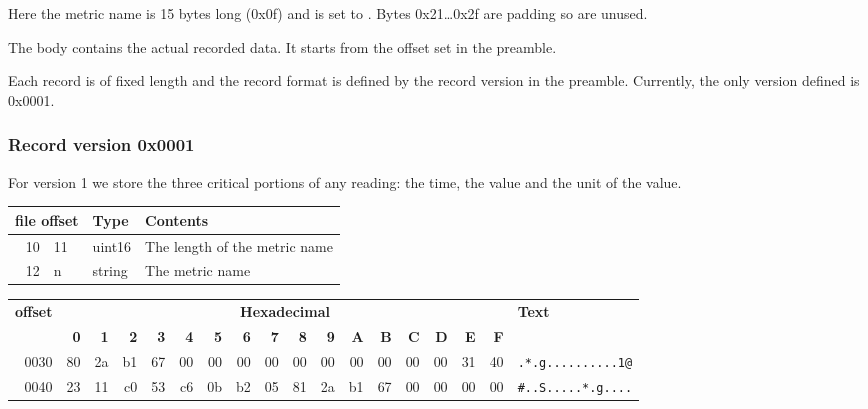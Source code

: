 Here the metric name is 15 bytes long (0x0f) and is set to .
Bytes 0x21\dots0x2f are padding so are unused.

\label{subsec:database:body}

The body contains the actual recorded data.
It starts from the offset set in the preamble.

Each record is of fixed length and the record format is defined by the record version in the preamble.
Currently, the only version defined is 0x0001.

\subsubsection{Record version 0x0001}
\label{subsubsec:database:record:0001}

For version 1 we store the three critical portions of any reading: the time, the value and the unit of the value.
\begin{table}[ht]
    \begin{tabular}{r l l l}
        \toprule
        \multicolumn{2}{c}{\textbf{file offset}} & \textbf{Type} & \textbf{Contents} \\
        \midrule
        10 & 11 & uint16 & The length of the metric name \\
        12 & n & string & The metric name \\
        \bottomrule
    \end{tabular}
\end{table}

\begin{table}[h*)]
    \begin{tabular}{r|rrrrrrrrrrrrrrrr|l}
        \hline
        \multirow{2}{*}{\textbf{offset}}& \multicolumn{16}{c|}{\textbf{Hexadecimal}} & \multirow{2}{*}{\textbf{Text}} \\
        &  \textbf{0}&\textbf{1}&\textbf{2}&\textbf{3}&
        \textbf{4}&\textbf{5}&\textbf{6}&\textbf{7}&
        \textbf{8}&\textbf{9}&\textbf{A}&\textbf{B}&
        \textbf{C}&\textbf{D}&\textbf{E}&\textbf{F}& \\
        \hline
        0030 &
        \cellcolor{yellow}80 & \cellcolor{yellow}2a & \cellcolor{yellow}b1 & \cellcolor{yellow}67 &
        \cellcolor{yellow}00 & \cellcolor{yellow}00 & \cellcolor{yellow}00 & \cellcolor{yellow}00 &
        \cellcolor{green!25}00 & \cellcolor{green!25}00 & \cellcolor{green!25}00 & \cellcolor{green!25}00 &
        \cellcolor{green!25}00 & \cellcolor{green!25}00 & \cellcolor{green!25}31 & \cellcolor{green!25}40 &
        \texttt{.*.g..........1@}\\
        \cline{10-17}
        0040 &
        \cellcolor{red!25}23 & \cellcolor{red!25}11 & \cellcolor{red!25}c0 & \cellcolor{red!25}53 &
        \cellcolor{red!25}c6 & \cellcolor{red!25}0b & \cellcolor{red!25}b2 & \multicolumn{1}{r|}{\cellcolor{red!25}05} &
        81 & 2a & b1 & 67 & 00 & 00 & 00 & 00 & \texttt{#..S.....*.g....}\\
        \cline{2-9}
    \end{tabular}
\end{table}
